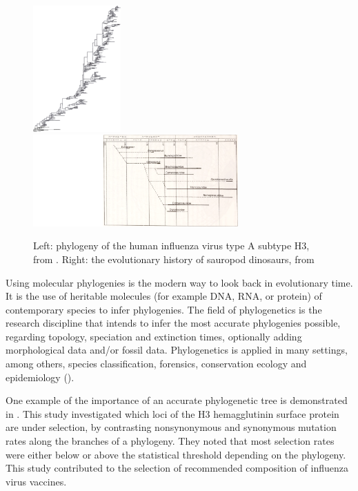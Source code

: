\begin{figure}[H]
  \includegraphics[width=0.3\textwidth]{bush_et_al_1999}
  \includegraphics[width=0.7\textwidth]{dinosaur_phylogeny.png}
  \caption{
    Left: phylogeny of the human influenza virus type A subtype H3,
    from \cite{bush1999positive}.
    Right: the evolutionary history of sauropod dinosaurs,
    from \cite{upchurch1995evolutionary}
  }
  \label{fig:bush_et_al_1999}
\end{figure}

Using molecular phylogenies is the modern way to look back in evolutionary time.
It is the use of heritable molecules (for example DNA, RNA, or protein)  
of contemporary species to infer phylogenies. 
The field of phylogenetics is the research discipline that
intends to infer the most accurate phylogenies possible, 
regarding topology, speciation and extinction times,
optionally adding morphological data and/or fossil data.
Phylogenetics is applied in many settings, among
others, species classification,
forensics, conservation ecology
and epidemiology (\cite{lam2010use}).

One example of the importance of an accurate phylogenetic tree 
is demonstrated in \cite{bush1999positive}. This study
investigated which loci of the H3 hemagglutinin surface protein
are under selection, by contrasting nonsynonymous and synonymous
mutation rates along the branches of a phylogeny. 
They noted that
most selection rates were either below or above the 
statistical threshold depending on the phylogeny.
This study contributed to the selection of recommended 
composition of influenza virus vaccines.

